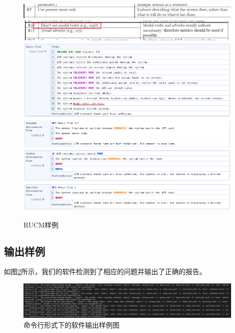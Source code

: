 \begin{figure}[ht]
    \begin{center}
        \includegraphics[scale=0.35]{src/introduction-r5.png}
        \includegraphics[scale=0.35]{src/introduction-r10.png}
        \includegraphics[scale=0.6]{src/introduction-3.png}
        \caption{RUCM样例}
        \label{fig-introduction-3}
    \end{center}
\end{figure}
\subsection{输出样例}
如图\ref{fig-introduction-4}所示，我们的软件检测到了相应的问题并输出了正确的报告。
\begin{figure}[h]
    \begin{center}
        \includegraphics[scale=0.35]{src/introduction-4.png}
        \caption{命令行形式下的软件输出样例图}
        \label{fig-introduction-4}
    \end{center}
\end{figure}